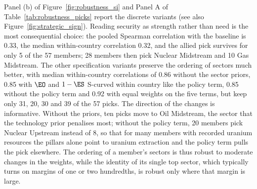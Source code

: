 Panel (b) of Figure~\ref{fig:robustness_si} and Panel A of Table~\ref{tab:robustness_picks}
report the discrete variants (see also Figure~\ref{fig:strategic_sign}). Reading security as
strength rather than need is the most consequential choice: the pooled Spearman correlation with
the baseline is 0.33, the median within-country correlation 0.32, and the allied pick survives
for only 5 of the 57 members; 28 members then pick Nuclear Midstream and 10 Gas Midstream.
The other specification variants preserve the ordering of sectors much better, with median
within-country correlations of 0.86 without the sector priors, 0.85 with $\EO$ and $1-\ES$
S-curved within country like the policy term, 0.85 without the policy term and 0.92 with equal
weights on the five terms, but keep only 31, 20, 30 and 39 of the 57 picks. The direction of the
changes is informative. Without the priors, ten picks move to Oil Midstream, the sector that the
technology prior penalises most; without the policy term, 20 members pick Nuclear Upstream
instead of 8, so that for many members with recorded uranium resources the pillars alone point
to uranium extraction and the policy term pulls the pick elsewhere. The ordering of a member's sectors is thus robust to moderate changes in the
weights, while the identity of its single top sector, which typically turns on margins of one or
two hundredths, is robust only where that margin is large.

